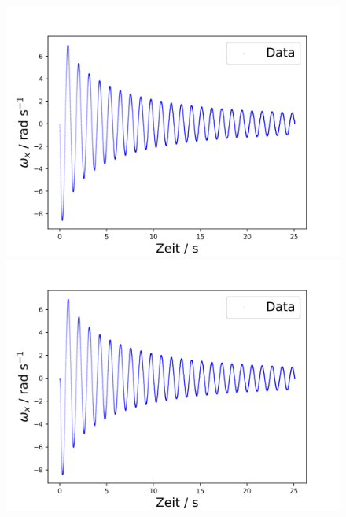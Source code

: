 \documentclass[11pt,ngerman]{scrartcl}
\begin{document}
\begin{figure}[H]
    \centering
    \begin{minipage}[htbp]{\linewidth}
        \begin{minipage}[htbp]{.32\linewidth} %
            \includegraphics[width=\linewidth]{pics/omega/fit_of_t_wx_mess_nr_10.png}
        \end{minipage}
        \begin{minipage}[htbp]{.32\linewidth} %
            \includegraphics[width=\linewidth]{pics/omega/fit_of_t_wx_mess_nr_11.png}
        \end{minipage}
        \begin{minipage}[htbp]{.32\linewidth} %

\end{minipage}
\end{minipage}
\end{figure}
\end{document}
